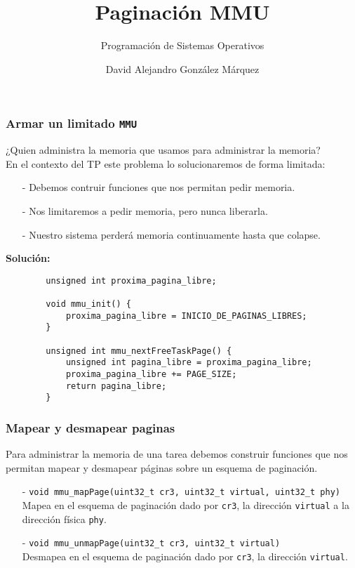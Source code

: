 \documentclass[aspectratio=169]{beamer}
\title{\Huge Paginación MMU}
\subtitle{Programación de Sistemas Operativos}
\author{David Alejandro González Márquez}
\institute{Departamento de Computación\\
Facultad de Ciencias Exactas y Naturales\\
Universidad de Buenos Aires}
\date{}
\begin{document}
\frame[plain]{\titlepage}

\begin{frame}[fragile]
    \frametitle{Armar un limitado \texttt{MMU}}
    \vspace{0.3cm}
    \textcolor{verdeuca}{¿Quien administra la memoria que usamos para administrar la memoria?}\\
    \vspace{0.3cm}
    \pause
    En el contexto del TP este problema lo solucionaremos de forma limitada:
    \pause
    \begin{itemize}
    \small
    \item[-] Debemos contruir funciones que nos permitan pedir memoria.
    \pause
    \item[-] Nos limitaremos a pedir memoria, pero nunca liberarla.
    \pause
    \item[-] Nuestro sistema perderá memoria continuamente hasta que colapse.
    \end{itemize}
    \pause
    \vspace{0.3cm}
    \textbf{Solución:}
    \footnotesize
    \begin{verbatim}
        unsigned int proxima_pagina_libre;

        void mmu_init() {
            proxima_pagina_libre = INICIO_DE_PAGINAS_LIBRES;
        }

        unsigned int mmu_nextFreeTaskPage() {
            unsigned int pagina_libre = proxima_pagina_libre;
            proxima_pagina_libre += PAGE_SIZE;
            return pagina_libre;
        }
    \end{verbatim}
\end{frame}

\begin{frame}[fragile]
    \frametitle{Mapear y desmapear paginas}
    Para administrar la memoria de una tarea debemos construir funciones que nos permitan mapear y desmapear páginas sobre un esquema de paginación.
    \pause
    \vspace{0.6cm}
    \begin{itemize}
    \item[-] \textcolor{naranjauca}{\texttt{void mmu\_mapPage(uint32\_t cr3, uint32\_t virtual, uint32\_t phy)}}\\
    Mapea en el esquema de paginación dado por \texttt{cr3}, la dirección \texttt{virtual} a la dirección física \texttt{phy}.
    \pause
    \item[-] \textcolor{naranjauca}{\texttt{void mmu\_unmapPage(uint32\_t cr3, uint32\_t virtual)}}\\
    Desmapea en el esquema de paginación dado por \texttt{cr3}, la dirección \texttt{virtual}.
    \end{itemize}
\end{frame}
\end{document}
